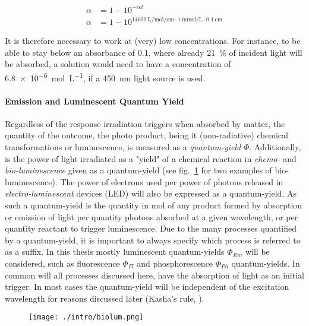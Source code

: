 			\begin{equation}
			\label{eq:rubpy3exp}
			\begin{split}
				\alpha &= 1 - 10^{-\epsilon c l} \\
				\alpha &= 1 - 10^{\qty{14600}{\L\per\mol\per\cm} \cdot \qty{1}{\milli\mol\per\L \cdot \qty{0.1}{\cm} }}
			\end{split}
			\end{equation} 

			It is therefore necessary to work at (very) low concentrations. For instance, to be able to stay below an absorbance of 0.1, where already \qty{21}{\percent} of incident light will be absorbed, a  solution would need to have a concentration of \qty{6.8e-6}{\mol\per\L}, if a \qty{450}{\nm} light source is used.

			\paragraph{Emission and Luminescent Quantum Yield}
			Regardless of the response irradiation triggers when absorbed by matter, the quantity of the outcome, the photo product, being it (non-radiative) chemical transformations or luminescence, is measured as a \emph{quantum-yield} $\Phi$. Additionally, is the power of light irradiated as a "yield" of a chemical reaction in \emph{chemo-} and \emph{bio-luminescence} given as a quantum-yield (see fig.~\ref{fig:biolum} for two examples of bio-luminescence). The power of electrons used per power of photons released in \emph{electro-luminescent} devices (LED) will also be expressed as a quantum-yield. As such a quantum-yield is the quantity in \unit{\mol} of any product formed by absorption or emission of light per quantity photons absorbed at a given wavelength, or per quantity reactant to trigger luminescence. Due to the many processes quantified by a quantum-yield, it is important to always specify which process is referred to as a suffix. In this thesis mostly luminescent quantum-yields $\Phi_{Em}$ will be considered, such as fluorescence $\Phi_{Fl}$ and phosphorescence $\Phi_{Ph}$ quantum-yields. In common will all processes discussed here, have the absorption of light as an initial trigger. In most cases the quantum-yield will be independent of the excitation wavelength for reasons discussed later (Kasha's rule, \pageref{kasha}).

			\begin{figure}[!h]
				\centering
				\label{fig:biolum}
				\texttt{[image: ./intro/biolum.png]}
				\caption{}
			\end{figure} 

